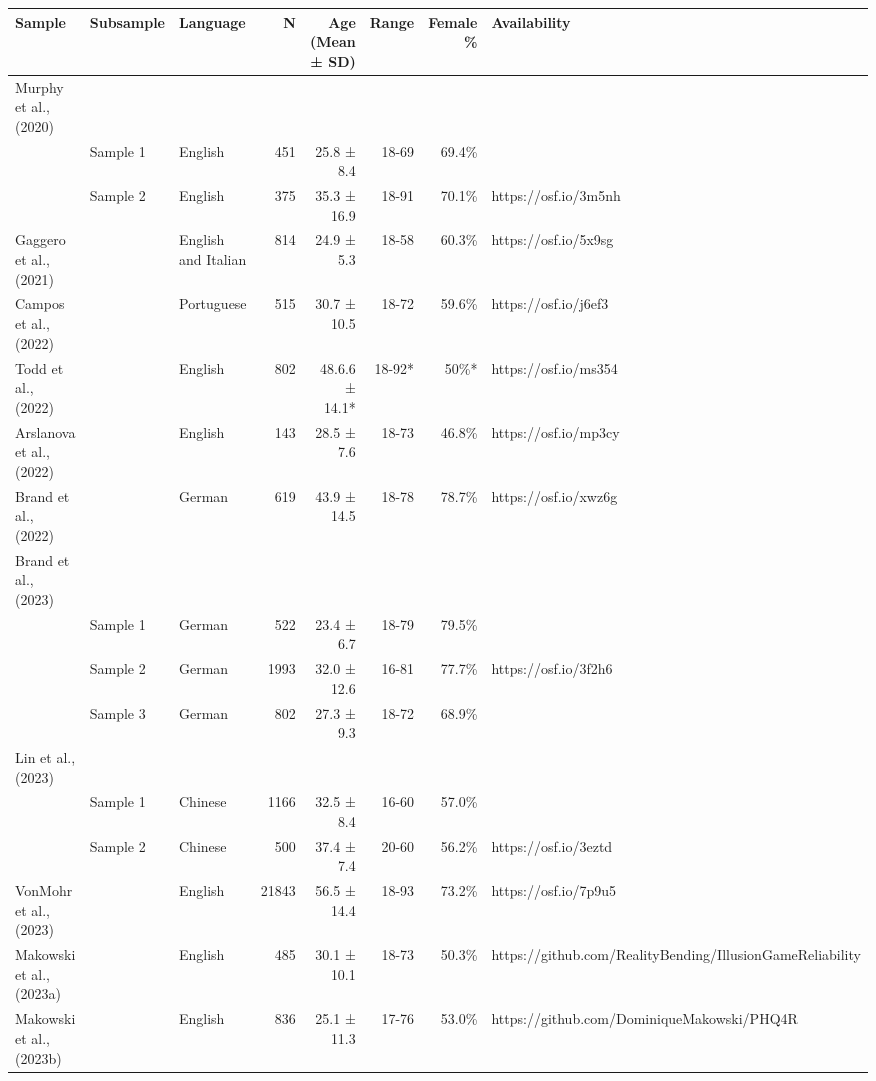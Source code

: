 \begin{table}
\fontsize{9.0pt}{10.8pt}\selectfont
\begin{tabular*}{\linewidth}{@{\extracolsep{\fill}}lllrrrrl}
\toprule
Sample & Subsample & Language & N & Age (Mean  ± SD) & Range & Female \% & Availability \\ 
\midrule\addlinespace[2.5pt]
Murphy et al., (2020) &  &  &  &  &  &  &  \\ 
 & Sample 1 & English & 451 & 25.8 ± 8.4 & 18-69 & 69.4\% &  \\ 
 & Sample 2 & English & 375 & 35.3 ± 16.9 & 18-91 & 70.1\% & https://osf.io/3m5nh \\ 
Gaggero et al., (2021) &  & English and Italian & 814 & 24.9 ± 5.3 & 18-58 & 60.3\% & https://osf.io/5x9sg \\ 
Campos et al., (2022) &  & Portuguese & 515 & 30.7 ± 10.5 & 18-72 & 59.6\% & https://osf.io/j6ef3 \\ 
Todd et al., (2022) &  & English & 802 & 48.6.6 ± 14.1* & 18-92* & 50\%* & https://osf.io/ms354 \\ 
Arslanova et al., (2022) &  & English & 143 & 28.5 ± 7.6 & 18-73 & 46.8\% & https://osf.io/mp3cy \\ 
Brand et al., (2022) &  & German & 619 & 43.9 ± 14.5 & 18-78 & 78.7\% & https://osf.io/xwz6g \\ 
Brand et al., (2023) &  &  &  &  &  &  &  \\ 
 & Sample 1 & German & 522 & 23.4 ± 6.7 & 18-79 & 79.5\% &  \\ 
 & Sample 2 & German & 1993 & 32.0 ± 12.6 & 16-81 & 77.7\% & https://osf.io/3f2h6 \\ 
 & Sample 3 & German & 802 & 27.3 ± 9.3 & 18-72 & 68.9\% &  \\ 
Lin et al., (2023) &  &  &  &  &  &  &  \\ 
 & Sample 1 & Chinese & 1166 & 32.5 ± 8.4 & 16-60 & 57.0\% &  \\ 
 & Sample 2 & Chinese & 500 & 37.4 ± 7.4 & 20-60 & 56.2\% & https://osf.io/3eztd \\ 
VonMohr et al., (2023) &  & English & 21843 & 56.5 ± 14.4 & 18-93 & 73.2\% & https://osf.io/7p9u5 \\ 
Makowski et al., (2023a) &  & English & 485 & 30.1 ± 10.1 & 18-73 & 50.3\% & https://github.com/RealityBending/IllusionGameReliability \\ 
Makowski et al., (2023b) &  & English & 836 & 25.1 ± 11.3 & 17-76 & 53.0\% & https://github.com/DominiqueMakowski/PHQ4R \\ 

\end{tabular*}
\end{table}
